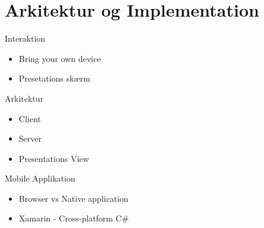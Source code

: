 \section{Arkitektur og Implementation}
\label{sub:arkitektur_og_implementation}
\begin{frame}[t]{Interaktion}
	\begin{itemize}
		\item Bring your own device
		\item Presetations skærm
	\end{itemize}	
\end{frame}

\begin{frame}[t]{Arkitektur}
	\begin{itemize}
		\item Client
		\item Server
		\item Presentations View
	\end{itemize}
\end{frame}


\begin{frame}[t]{Mobile Applikation}
	\begin{itemize}
		\item Browser vs Native application
		\item Xamarin - Cross-platform C#
	\end{itemize}	
\end{frame}

